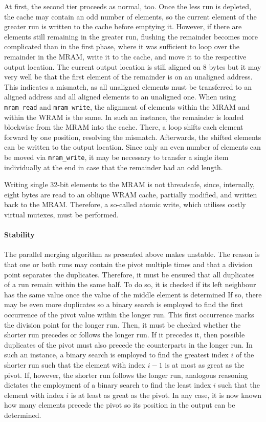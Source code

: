 At first, the second tier proceeds as normal, too.
Once the less run is depleted, the cache may contain an odd number of elements, so the current element of the greater run is written to the cache before emptying it.
However, if there are elements still remaining in the greater run, flushing the remainder becomes more complicated than in the first phase, where it was sufficient to loop over the remainder in the MRAM, write it to the cache, and move it to the respective output location.
The current output location is still aligned on 8 bytes but it may very well be that the first element of the remainder is on an unaligned address.
This indicates a mismatch, as all unaligned elements must be transferred to an aligned address and all aligned elements to an unaligned one.
When using \lstinline|mram_read| and \lstinline|mram_write|, the alignment of elements within the MRAM and within the WRAM is the same.
In such an instance, the remainder is loaded blockwise from the MRAM into the cache.
There, a loop shifts each element forward by one position, resolving the mismatch.
Afterwards, the shifted elements can be written to the output location.
Since only an even number of elements can be moved via \lstinline|mram_write|, it may be necessary to transfer a single item individually at the end in case that the remainder had an odd length.

Writing single 32-bit elements to the MRAM is not threadsafe, since, internally, eight bytes are read to an oblique WRAM cache, partially modified, and written back to the MRAM.
Therefore, a so-called atomic write, which utilises costly virtual mutexes, must be performed.


\paragraph{Stability}
The parallel merging algorithm as presented above makes \MS{} unstable.
The reason is that one or both runs may contain the pivot multiple times and that a division point separates the duplicates.
Therefore, it must be ensured that all duplicates of a run remain within the same half.
To do so, it is checked if its left neighbour has the same value once the value of the middle element is determined
If so, there may be even more duplicates so a binary search is employed to find the first occurrence of the pivot value within the longer run.
This first occurrence marks the division point for the longer run.
Then, it must be checked whether the shorter run precedes or follows the longer run.
If it precedes it, then possible duplicates of the pivot must also precede the counterparts in the longer run.
In such an instance, a binary search is employed to find the greatest index \(i\) of the shorter run such that the element with index \(i - 1\) is at most as great as the pivot.
If, however, the shorter run follows the longer run, analogous reasoning dictates the employment of a binary search to find the least index \(i\) such that the element with index \(i\) is at least as great as the pivot.
In any case, it is now known how many elements precede the pivot so its position in the output can be determined.

